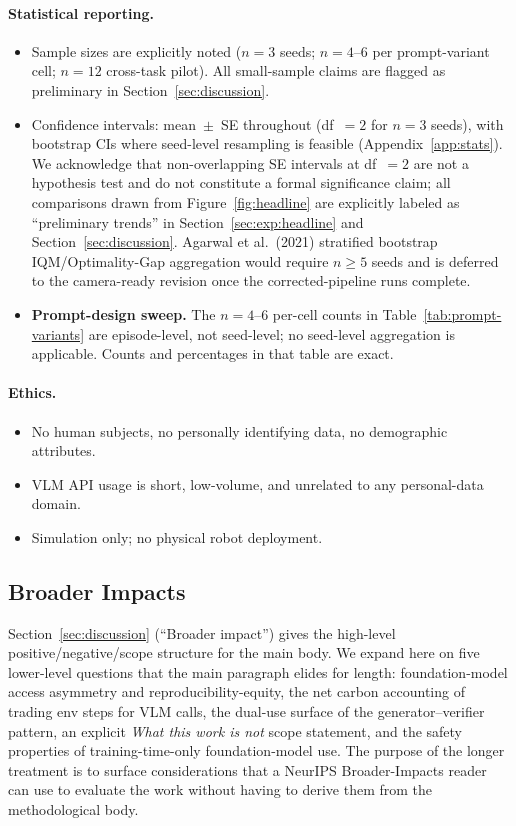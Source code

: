 \paragraph{Statistical reporting.}
\begin{itemize}\itemsep0pt
\item Sample sizes are explicitly noted ($n\!=\!3$ seeds; $n\!=\!4$--6 per
prompt-variant cell; $n\!=\!12$ cross-task pilot). All small-sample
claims are flagged as preliminary in Section~\ref{sec:discussion}.
\item Confidence intervals: mean~$\pm$~SE throughout (df~$=2$ for
$n\!=\!3$ seeds), with bootstrap CIs where seed-level resampling is
feasible (Appendix~\ref{app:stats}). We acknowledge that non-overlapping
SE intervals at df~$=\!2$ are not a hypothesis test and do not constitute
a formal significance claim; all comparisons drawn from Figure~\ref{fig:headline}
are explicitly labeled as ``preliminary trends'' in
Section~\ref{sec:exp:headline} and Section~\ref{sec:discussion}.
Agarwal et al.\ (2021) stratified bootstrap IQM/Optimality-Gap
aggregation would require $n\!\ge\!5$ seeds and is deferred to the
camera-ready revision once the corrected-pipeline runs complete.
\item \textbf{Prompt-design sweep.} The $n\!=\!4$--6 per-cell counts in
Table~\ref{tab:prompt-variants} are episode-level, not seed-level; no
seed-level aggregation is applicable. Counts and percentages in that
table are exact.
\end{itemize}

\paragraph{Ethics.}
\begin{itemize}\itemsep0pt
\item No human subjects, no personally identifying data, no demographic
attributes.
\item VLM API usage is short, low-volume, and unrelated to any
personal-data domain.
\item Simulation only; no physical robot deployment.
\end{itemize}

\subsection{Broader Impacts}
\label{app:impact}

Section~\ref{sec:discussion} (``Broader impact'') gives the
high-level positive/negative/scope structure for the main body. We
expand here on five lower-level questions that the main paragraph
elides for length: foundation-model access asymmetry and
reproducibility-equity, the net carbon accounting of trading env
steps for VLM calls, the dual-use surface of the generator--verifier
pattern, an explicit \emph{What this work is not} scope statement, and
the safety properties of training-time-only foundation-model use. The
purpose of the longer treatment is to surface considerations that a
NeurIPS Broader-Impacts reader can use to evaluate the work without
having to derive them from the methodological body.

